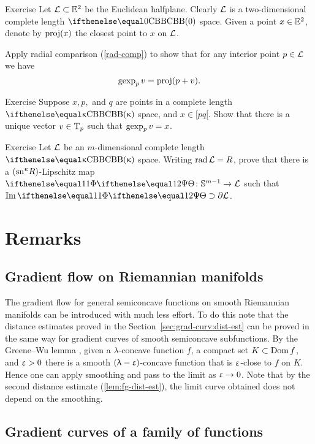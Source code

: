\begin{thm}{Exercise}\label{ex:gexp} 
Let $\spc{L}\subset\EE^2$ be the Euclidean halfplane. 
Clearly $\mathcal{L}$ is a two-dimensional complete length $\Alex{0}$ space.
Given a point $x\in \EE^2$, denote by $\mathop{\rm proj}\nolimits(x)$ the closest point to $x$ on $\mathcal{L}$. 

Apply radial comparison (\ref{rad-comp}) to show that for any interior point $p\in \spc{L}$ we have 
\[\mathop{\rm gexp}\nolimits_p v=\mathop{\rm proj}\nolimits(p+v).\]
\end{thm}

\begin{thm}{Exercise}\label{ex:inv-gexp}
Suppose $x,p,$ and $q$ are points in a complete length $\Alex\kappa$ space, and $x\in [pq[$.
Show that there is a unique vector $v\in\T_p$ such that $\mathop{\rm gexp}\nolimits_p v=x$.
\end{thm}


{\sloppy 

\begin{thm}{Exercise}\label{ex:bry-cover}
Let $\mathcal{L}$ be an $m$-dimensional complete length $\Alex\kappa$ space. Writing $\mathop{\rm rad}\nolimits\mathcal{L}=R$, 
prove that there is a $(\mathrm{sn}^{\upkappa} R)$-Lipschitz map $\map\:\mathbb{S}^{m-1}\to\spc{L}$ such that $\Im\map\supset\partial\spc{L}$.
\end{thm}

}

\section{Remarks}

\subsection*{Gradient flow on Riemannian manifolds}
The gradient flow for general semiconcave functions 
on smooth Riemannian manifolds  can be introduced with much less effort.
To do this note that the distance estimates proved in the Section~\ref{sec:grad-curv:dist-est}
can be proved in the same way for gradient curves of smooth semiconcave subfunctions.
By the Greene--Wu lemma \cite{greene-wu}, 
given 
a $\lambda$-concave function $f$, 
a compact set $K\subset \Dom f$,
and $\upvarepsilon>0$
there is a smooth $(\uplambda-\upvarepsilon)$-concave function that is 
$\upvarepsilon$-close to $f$ on $K$.
Hence one can apply smoothing and pass to the limit as $\eps\to0$.
Note that by the second distance  estimate (\ref{lem:fg-dist-est}), the  limit curve obtained does not depend on the smoothing.

\subsection*{Gradient curves of a family of functions}

